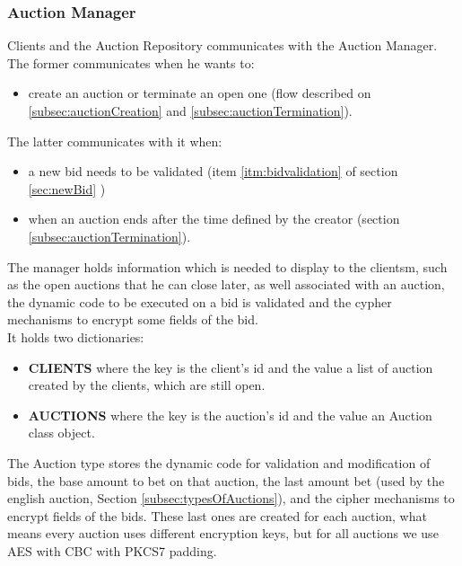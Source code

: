 \documentclass[12pt]{article}
\begin{document}
\subsubsection{Auction Manager}
Clients and the Auction Repository communicates with the Auction Manager. \\
The former communicates when he wants to:
\begin{itemize}
   \item create an auction or terminate an open one (flow described on \ref{subsec:auctionCreation} 
  and \ref{subsec:auctionTermination}). 
\end{itemize}
  The latter communicates with it when:
\begin{itemize}
  \item  a new bid needs to be validated (item \ref{itm:bidvalidation} of section \ref{sec:newBid} )
  \item when an auction ends after the time defined by the creator (section \ref{subsec:auctionTermination}). \\
\end{itemize}
The manager holds information which is needed to display to the clientsm, such as the open
  auctions that he can close later, as well associated with an auction, the dynamic code
  to be executed on a bid is validated and the cypher mechanisms to encrypt some fields of
  the bid. \\
It holds two dictionaries:
\begin{itemize}
  \item \textbf{CLIENTS} where the key is the client's id and the value a list of auction created by the clients, which are still open.
  \item \textbf{AUCTIONS} where the key is the auction's id  and the value an Auction class object.
\end{itemize}

The Auction type stores the dynamic code for validation and modification of bids, the base amount
  to bet on that auction, the last amount bet (used by the english auction, Section \ref{subsec:typesOfAuctions}), 
  and the cipher mechanisms to encrypt fields of the bids. These last ones are created 
  for each auction, what means every auction uses different encryption keys, but for all auctions
  we use AES with CBC with PKCS7 padding.
\end{document}
